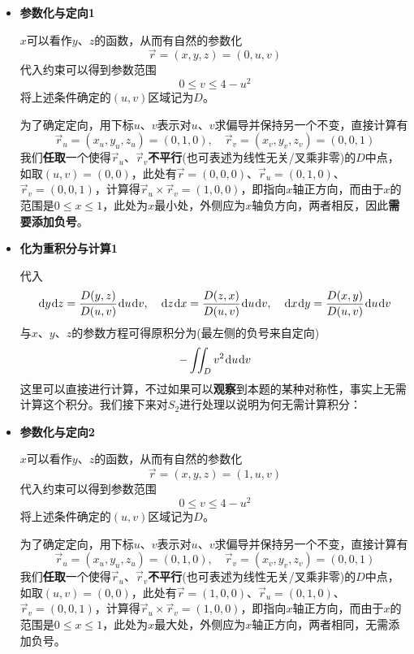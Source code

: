 \documentclass[a4paper,UTF8,fontset=windows,AutoFakeBold]{ctexart}
\newcommand*{\dr}{\hspace{0.07em}\mathrm{d}}
\newcommand*{\rv}{\vec{r}}
\theoremstyle{ex}
\begin{document}
\begin{enumerate}
{\begin{itemize}
            代入每个部分满足的条件可得到每个部分的化简表述：
            $$S_1:\quad x=0,\quad 0\le z\le 4-y^2$$
            $$S_2:\quad x=1,\quad 0\le z\le 4-y^2$$
            $$S_3:\quad z=0,\quad 0\le x\le1,\quad y^2\le4$$
            $$S_4:\quad z=4-y^2,\quad 0\le x\le1,\quad y^2\le4$$
            下面分别计算每个部分的积分，再求和。
            
            \item \textbf{参数化与定向1}
            
            $x$可以看作$y$、$z$的函数，从而有自然的参数化
            $$\vec{r}=(x,y,z)=(0,u,v)$$
            代入约束可以得到参数范围
            $$0\le v\le 4-u^2$$
            将上述条件确定的$(u,v)$区域记为$D$。

            为了确定定向，用下标$u$、$v$表示对$u$、$v$求偏导并保持另一个不变，直接计算有
            $$\rv_u=(x_u,y_u,z_u)=(0,1,0),\quad\rv_v=(x_v,y_v,z_v)=(0,0,1)$$
            我们\textbf{任取}一个使得$\rv_u$、$\rv_v$\textbf{不平行}(也可表述为线性无关/叉乘非零)的$D$中点，如取$(u,v)=(0,0)$，此处有$\rv=(0,0,0)$、$\rv_u=(0,1,0)$、$\rv_v=(0,0,1)$，计算得$\rv_u\times\rv_v=(1,0,0)$，即指向$x$轴正方向，而由于$x$的范围是$0\le x\le1$，此处为$x$最小处，外侧应为$x$轴负方向，两者相反，因此\textbf{需要添加负号}。
            
            \item \textbf{化为重积分与计算1}
            
            代入
            $$\dr y\dr z=\frac{D(y,z)}{D(u,v)}\dr u\dr v,\quad\dr z\dr x=\frac{D(z,x)}{D(u,v)}\dr u\dr v,\quad\dr x\dr y=\frac{D(x,y)}{D(u,v)}\dr u\dr v$$
            与$x$、$y$、$z$的参数方程可得原积分为(最左侧的负号来自定向)
            $$-\iint_Dv^2\dr u\dr v$$
            这里可以直接进行计算，不过如果可以\textbf{观察}到本题的某种对称性，事实上无需计算这个积分。我们接下来对$S_2$进行处理以说明为何无需计算积分：

            \item \textbf{参数化与定向2}
            
            $x$可以看作$y$、$z$的函数，从而有自然的参数化
            $$\vec{r}=(x,y,z)=(1,u,v)$$
            代入约束可以得到参数范围
            $$0\le v\le 4-u^2$$
            将上述条件确定的$(u,v)$区域记为$D$。

            为了确定定向，用下标$u$、$v$表示对$u$、$v$求偏导并保持另一个不变，直接计算有
            $$\rv_u=(x_u,y_u,z_u)=(0,1,0),\quad\rv_v=(x_v,y_v,z_v)=(0,0,1)$$
            我们\textbf{任取}一个使得$\rv_u$、$\rv_v$\textbf{不平行}(也可表述为线性无关/叉乘非零)的$D$中点，如取$(u,v)=(0,0)$，此处有$\rv=(1,0,0)$、$\rv_u=(0,1,0)$、$\rv_v=(0,0,1)$，计算得$\rv_u\times\rv_v=(1,0,0)$，即指向$x$轴正方向，而由于$x$的范围是$0\le x\le1$，此处为$x$最大处，外侧应为$x$轴正方向，两者相同，无需添加负号。
            

\end{itemize}}
\end{enumerate}
\end{document}
